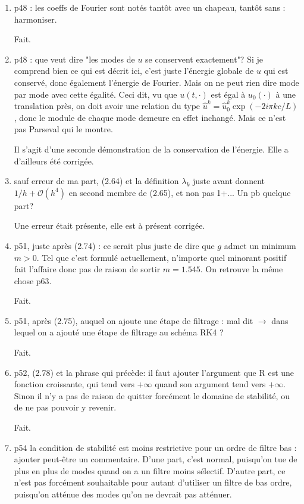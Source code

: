 \documentclass[10pt,a4paper]{article}
\begin{document}
\begin{enumerate}
\item p48 : les coeffs de Fourier sont notés tantôt avec un chapeau, tantôt sans : harmoniser.

{\color{blue} Fait.} 


\item p48 : que veut dire "les modes de $u$ se conservent exactement"? Si je comprend bien ce qui est décrit ici, c'est juste l'énergie globale de $u$ qui est conservé, donc également l'énergie de Fourier. Mais on ne peut rien dire mode par mode avec cette égalité. Ceci dit, vu que $u(t,\cdot)$ est égal à $u_0(\cdot)$ à une translation près, on doit avoir une relation du type $\hat{u}^k = \hat{u}^k_0 \exp (-2i \pi k c /L)$, donc le module de chaque mode demeure en effet inchangé. Mais ce n'est pas Parseval qui le montre.

{\color{blue} Il s'agit d'une seconde démonstration de la conservation de l'énergie. Elle a d'ailleurs été corrigée.} 


\item sauf erreur de ma part, (2.64) et la définition $\lambda_k$ juste avant donnent $1/h + \mathcal{O}(h^4)$ en second membre de (2.65), et non pas 1+... Un pb quelque part?

{\color{blue} Une erreur était présente, elle est à présent corrigée.} 


\item p51, juste après (2.74) : ce serait plus juste de dire que $g$ admet un minimum $m>0$. Tel que c'est formulé actuellement, n'importe quel minorant positif fait l'affaire donc pas de raison de sortir $m=1.545$. On retrouve la même chose p63.

{\color{blue} Fait.} 


\item p51, après (2.75), auquel on ajoute une étape de filtrage : mal dit $\rightarrow$ dans lequel on a ajouté une étape de filtrage au schéma RK4 ?

{\color{blue} Fait.} 


\item p52, (2.78) et la phrase qui précède: il faut ajouter l’argument que R est une fonction
croissante, qui tend vers $+\infty$ quand son argument tend vers $+\infty$. Sinon il n’y a pas
de raison de quitter forcément le domaine de stabilité, ou de ne pas pouvoir y revenir.

{\color{blue} Fait.} 


\item p54 la condition de stabilité est moins restrictive pour un ordre de filtre bas : ajouter
peut-être un commentaire. D’une part, c’est normal, puisqu’on tue de plus en plus
de modes quand on a un filtre moins sélectif. D’autre part, ce n’est pas forcément
souhaitable pour autant d’utiliser un filtre de bas ordre, puisqu’on atténue des modes
qu’on ne devrait pas atténuer.


\end{enumerate}
\end{document}
